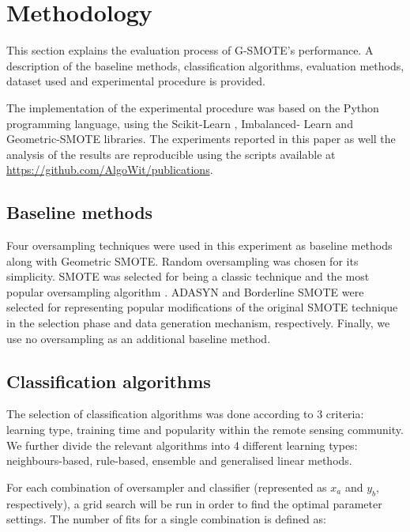 \documentclass[parskip=full]{scrartcl}
\begin{document}
\section{Methodology}

This section explains the evaluation process of G-SMOTE's performance. A
description of the baseline methods, classification algorithms, evaluation
methods, dataset used and experimental procedure is provided.

The implementation of the experimental procedure was based on the Python
programming language, using the Scikit-Learn \cite{Pedregosa2011}, Imbalanced-
Learn \cite{JMLR:v18:16-365} and Geometric-SMOTE \cite{Douzas2019} libraries.
The experiments reported in this paper as well the analysis of the results are
reproducible using the scripts available at \url{https://github.com/AlgoWit/publications}.

\subsection{Baseline methods}

Four oversampling techniques were used in this experiment as baseline methods
along with Geometric SMOTE. Random oversampling was chosen for its simplicity.
SMOTE was selected for being a classic technique and the most popular
oversampling algorithm \cite{Douzas2019}. ADASYN  and
Borderline SMOTE  were selected for representing popular
modifications of the original SMOTE technique in the selection phase and data
generation mechanism, respectively. Finally, we use no oversampling as an
additional baseline method.

\subsection{Classification algorithms}

The selection of classification algorithms was done according to 3 criteria:
learning type, training time and popularity within the remote sensing
community. We further divide the relevant algorithms into 4 different learning
types: neighbours-based, rule-based, ensemble and generalised linear methods.

For each combination of oversampler and classifier (represented as $x_a$ and
$y_b$, respectively), a grid search will be run in order to find the optimal
parameter settings. The number of fits for a single combination  is defined as:
\end{document}
